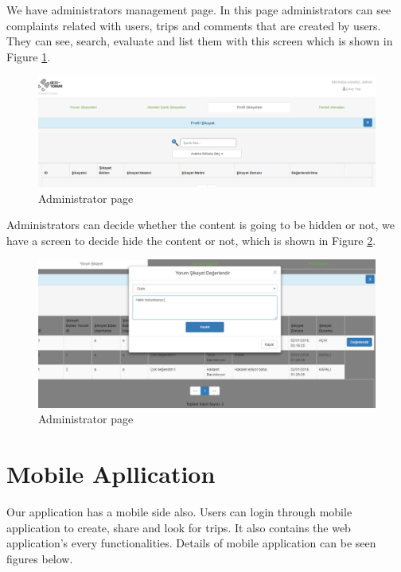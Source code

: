 \newpage

We have administrators management page. In this page administrators can see complaints related with users, trips and comments that are created by users. They can see, search, evaluate and list them with this screen which is shown in Figure \ref{fig:admin1}.
\begin{figure}[!htbp]
\centering
\includegraphics[width=\textwidth]{projectChapters/images/admin1.png}
\caption{Administrator page}
\label{fig:admin1}
\end{figure}

\newpage

Administrators can decide whether the content is going to be hidden or not, we have a screen to decide hide the content or not, which is shown in Figure  \ref{fig:admin2}.

\begin{figure}[!htbp]
\centering
\includegraphics[width=\textwidth]{projectChapters/images/admin2.png}
\caption{Administrator page}
\label{fig:admin2}
\end{figure}

\newpage


\section{Mobile Apllication}

Our application has a mobile side also. Users can login through mobile application to create, share and look for trips. It also contains the web application's every functionalities. Details of mobile application can be seen figures below.

